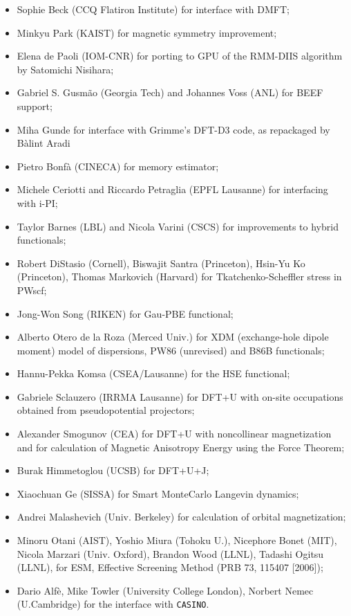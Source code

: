 \documentclass[12pt,a4paper]{article}
\begin{document}
\begin{itemize}
  \item Sophie Beck (CCQ Flatiron Institute) for interface with DMFT;
  \item Minkyu Park (KAIST) for magnetic symmetry improvement;
  \item Elena de Paoli (IOM-CNR) for porting to GPU of the RMM-DIIS
        algorithm by Satomichi Nisihara;
  \item Gabriel S. Gusmão (Georgia Tech) and Johannes Voss (ANL)
    for BEEF support;
  \item Miha Gunde for interface with Grimme's DFT-D3 code, as
	repackaged by Bàlint Aradi
  \item Pietro Bonf\`a (CINECA) for memory estimator;
  \item Michele Ceriotti and Riccardo Petraglia (EPFL Lausanne) for
        interfacing with i-PI;
  \item Taylor Barnes (LBL) and Nicola Varini (CSCS) for improvements
        to hybrid functionals;
  \item Robert DiStasio (Cornell), Biswajit Santra (Princeton),
        Hsin-Yu Ko (Princeton), Thomas Markovich (Harvard) for
        Tkatchenko-Scheffler stress in PWscf;
  \item Jong-Won Song (RIKEN) for Gau-PBE functional;
  \item Alberto Otero de la Roza (Merced Univ.) for XDM (exchange-hole 
        dipole moment) model of dispersions, PW86 (unrevised) and B86B
        functionals;
  \item Hannu-Pekka Komsa (CSEA/Lausanne) for the HSE functional;
  \item Gabriele Sclauzero (IRRMA Lausanne) for DFT+U
        with on-site occupations obtained from pseudopotential projectors;
  \item Alexander Smogunov (CEA) for DFT+U with noncollinear magnetization
        and for calculation of Magnetic Anisotropy Energy using the Force
        Theorem;
  \item Burak Himmetoglou (UCSB) for DFT+U+J;
  \item Xiaochuan Ge (SISSA) for Smart MonteCarlo Langevin dynamics;
  \item Andrei Malashevich (Univ. Berkeley) for calculation of orbital
        magnetization;
  \item Minoru Otani (AIST), Yoshio Miura (Tohoku U.), 
        Nicephore Bonet (MIT), Nicola Marzari (Univ. Oxford), 
        Brandon Wood (LLNL), Tadashi Ogitsu (LLNL), for ESM,
        Effective Screening Method (PRB 73, 115407 [2006]);
  \item Dario Alf\`e, Mike Towler (University College London), 
        Norbert Nemec (U.Cambridge) for the interface with \texttt{CASINO}.
\end{itemize}
\end{document}
